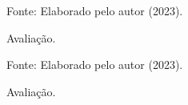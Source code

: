 \documentclass[
	12pt,				%
	openright,			%
	oneside,			%
	a4paper,			%
	english,			%
	french,				%
	spanish,			%
	brazil,				%
	]{abntex2}
\begin{document}
\begin{figure}[ht]
    \centering
    \caption{Avaliação.}
    \label{fig: grafico-acc}
    
    \centering \small Fonte: Elaborado pelo autor (2023).
\end{figure}

\begin{figure}[ht]
    \centering
    \caption{Avaliação.}
    \label{fig: grafico-acc}
    
    \centering \small Fonte: Elaborado pelo autor (2023).
\end{figure}






\end{document}
